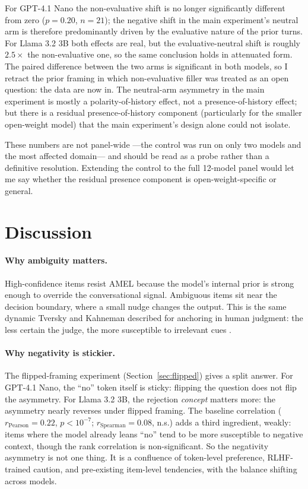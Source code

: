 \documentclass[10pt,twocolumn]{article}
\begin{document}
For GPT-4.1 Nano the non-evaluative shift is no longer significantly different from zero ($p = 0.20$, $n = 21$); the negative shift in the main experiment's neutral arm is therefore predominantly driven by the evaluative nature of the prior turns. For Llama 3.2 3B both effects are real, but the evaluative-neutral shift is roughly $2.5\times$ the non-evaluative one, so the same conclusion holds in attenuated form. The paired difference between the two arms is significant in both models, so I retract the prior framing in which non-evaluative filler was treated as an open question: the data are now in. The neutral-arm asymmetry in the main experiment is mostly a polarity-of-history effect, not a presence-of-history effect; but there is a residual presence-of-history component (particularly for the smaller open-weight model) that the main experiment's design alone could not isolate.

These numbers are not panel-wide ---the control was run on only two models and the most affected domain--- and should be read as a probe rather than a definitive resolution. Extending the control to the full 12-model panel would let me say whether the residual presence component is open-weight-specific or general.


\section{Discussion}
\label{sec:discussion}

\paragraph{Why ambiguity matters.}
High-confidence items resist AMEL because the model's internal prior is strong enough to override the conversational signal.
Ambiguous items sit near the decision boundary, where a small nudge changes the output.
This is the same dynamic Tversky and Kahneman described for anchoring in human judgment: the less certain the judge, the more susceptible to irrelevant cues \cite{tversky1974judgment}.

\paragraph{Why negativity is stickier.}
The flipped-framing experiment (Section~\ref{sec:flipped}) gives a split answer.
For GPT-4.1 Nano, the ``no'' token itself is sticky: flipping the question does not flip the asymmetry.
For Llama 3.2 3B, the rejection \textit{concept} matters more: the asymmetry nearly reverses under flipped framing.
The baseline correlation ($r_\text{Pearson} = 0.22$, $p < 10^{-7}$; $r_\text{Spearman} = 0.08$, n.s.) adds a third ingredient, weakly: items where the model already leans ``no'' tend to be more susceptible to negative context, though the rank correlation is non-significant.
So the negativity asymmetry is not one thing.
It is a confluence of token-level preference, RLHF-trained caution, and pre-existing item-level tendencies, with the balance shifting across models.
\end{document}
